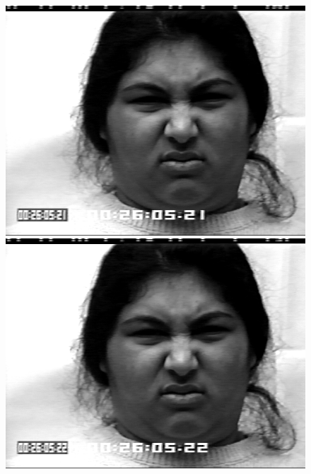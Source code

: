 \documentclass[12pt, a4paper]{scrbook}
\begin{document}
\begin{figure}[h]
\begin{minipage}[b]{.2\linewidth}
		\includegraphics[width=\linewidth]{Bilder/Disgust9.png}
	\end{minipage}
	\hspace{.025\linewidth}%
	\begin{minipage}[b]{.2\linewidth} %
		\includegraphics[width=\linewidth]{Bilder/Disgust10.png}
	\end{minipage}
	\hspace{.025\linewidth}%
	\begin{minipage}[b]{.2\linewidth} %

\end{minipage}
\end{figure}
\end{document}
